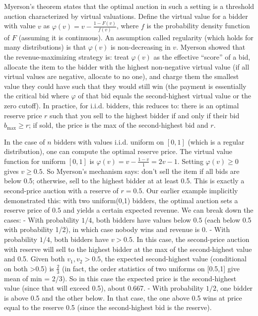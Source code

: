 \documentclass[
  letterpaper,
  numbers=noenddot,
  DIV=11]{scrreprt}
\theoremstyle{plain}
\theoremstyle{definition}
\theoremstyle{remark}
\begin{document}
Myerson's theorem states that the optimal auction in such a setting is a
threshold auction characterized by virtual valuations. Define the
virtual value for a bidder with value \(v\) as
\(\varphi(v) = v - \frac{1-F(v)}{f(v)}\), where \(f\) is the probability
density function of \(F\) (assuming it is continuous). An assumption
called regularity (which holds for many distributions) is that
\(\varphi(v)\) is non-decreasing in \(v\). Myerson showed that the
revenue-maximizing strategy is: treat \(\varphi(v)\) as the effective
``score'' of a bid, allocate the item to the bidder with the highest
non-negative virtual value (if all virtual values are negative, allocate
to no one), and charge them the smallest value they could have such that
they would still win (the payment is essentially the critical bid where
\(\varphi\) of that bid equals the second-highest virtual value or the
zero cutoff). In practice, for i.i.d. bidders, this reduces to: there is
an optimal reserve price \(r\) such that you sell to the highest bidder
if and only if their bid \(b_{\max} \ge r\); if sold, the price is the
max of the second-highest bid and \(r\).

In the case of \(n\) bidders with values i.i.d. uniform on \([0,1]\)
(which is a regular distribution), one can compute the optimal reserve
price. The virtual value function for uniform \([0,1]\) is
\(\varphi(v) = v - \frac{1-v}{1} = 2v - 1\). Setting \(\varphi(v)\ge 0\)
gives \(v \ge 0.5\). So Myerson's mechanism says: don't sell the item if
all bids are below 0.5; otherwise, sell to the highest bidder at at
least 0.5. This is exactly a second-price auction with a reserve of
\(r=0.5\). Our earlier example implicitly demonstrated this: with two
uniform(0,1) bidders, the optimal auction sets a reserve price of
\(0.5\) and yields a certain expected revenue. We can break down the
cases: - With probability \(1/4\), both bidders have values below
\(0.5\) (each below 0.5 with probability 1/2), in which case nobody wins
and revenue is 0. - With probability \(1/4\), both bidders have
\(v > 0.5\). In this case, the second-price auction with reserve will
sell to the highest bidder at the max of the second-highest value and
0.5. Given both \(v_1, v_2 > 0.5\), the expected second-highest value
(conditional on both \textgreater0.5) is \(\frac{2}{3}\) (in fact, the
order statistics of two uniforms on {[}0.5,1{]} give mean of min = 2/3).
So in this case the expected price is the second-highest value (since
that will exceed 0.5), about 0.667. - With probability \(1/2\), one
bidder is above 0.5 and the other below. In that case, the one above 0.5
wins at price equal to the reserve 0.5 (since the second-highest bid is
the reserve).
\end{document}
